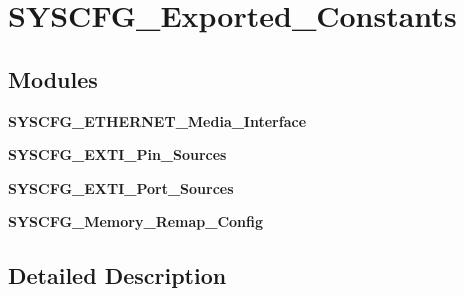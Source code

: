 \section{S\+Y\+S\+C\+F\+G\+\_\+\+Exported\+\_\+\+Constants}
\label{group__SYSCFG__Exported__Constants}
\subsection*{Modules}
\begin{DoxyCompactItemize}
\item 
\textbf{ S\+Y\+S\+C\+F\+G\+\_\+\+E\+T\+H\+E\+R\+N\+E\+T\+\_\+\+Media\+\_\+\+Interface}
\item 
\textbf{ S\+Y\+S\+C\+F\+G\+\_\+\+E\+X\+T\+I\+\_\+\+Pin\+\_\+\+Sources}
\item 
\textbf{ S\+Y\+S\+C\+F\+G\+\_\+\+E\+X\+T\+I\+\_\+\+Port\+\_\+\+Sources}
\item 
\textbf{ S\+Y\+S\+C\+F\+G\+\_\+\+Memory\+\_\+\+Remap\+\_\+\+Config}
\end{DoxyCompactItemize}


\subsection{Detailed Description}
